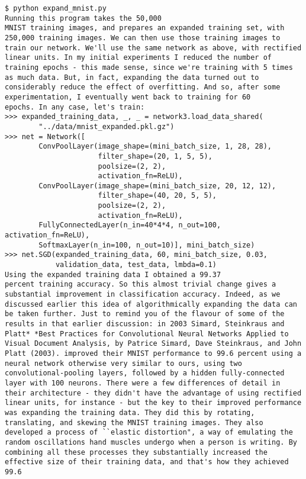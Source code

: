 \begin{lstlisting}
$ python expand_mnist.py
Running this program takes the 50,000
MNIST training images, and prepares an expanded training set, with 250,000 training images. We can then use those training images to train our network. We'll use the same network as above, with rectified linear units. In my initial experiments I reduced the number of training epochs - this made sense, since we're training with 5 times as much data. But, in fact, expanding the data turned out to considerably reduce the effect of overfitting. And so, after some experimentation, I eventually went back to training for 60
epochs. In any case, let's train:
>>> expanded_training_data, _, _ = network3.load_data_shared(
        "../data/mnist_expanded.pkl.gz")
>>> net = Network([
        ConvPoolLayer(image_shape=(mini_batch_size, 1, 28, 28), 
                      filter_shape=(20, 1, 5, 5), 
                      poolsize=(2, 2), 
                      activation_fn=ReLU),
        ConvPoolLayer(image_shape=(mini_batch_size, 20, 12, 12), 
                      filter_shape=(40, 20, 5, 5), 
                      poolsize=(2, 2), 
                      activation_fn=ReLU),
        FullyConnectedLayer(n_in=40*4*4, n_out=100, activation_fn=ReLU),
        SoftmaxLayer(n_in=100, n_out=10)], mini_batch_size)
>>> net.SGD(expanded_training_data, 60, mini_batch_size, 0.03, 
            validation_data, test_data, lmbda=0.1)
Using the expanded training data I obtained a 99.37
percent training accuracy. So this almost trivial change gives a substantial improvement in classification accuracy. Indeed, as we discussed earlier this idea of algorithmically expanding the data can be taken further. Just to remind you of the flavour of some of the results in that earlier discussion: in 2003 Simard, Steinkraus and Platt* *Best Practices for Convolutional Neural Networks Applied to Visual Document Analysis, by Patrice Simard, Dave Steinkraus, and John Platt (2003). improved their MNIST performance to 99.6 percent using a neural network otherwise very similar to ours, using two convolutional-pooling layers, followed by a hidden fully-connected layer with 100 neurons. There were a few differences of detail in their architecture - they didn't have the advantage of using rectified linear units, for instance - but the key to their improved performance was expanding the training data. They did this by rotating, translating, and skewing the MNIST training images. They also developed a process of ``elastic distortion", a way of emulating the random oscillations hand muscles undergo when a person is writing. By combining all these processes they substantially increased the effective size of their training data, and that's how they achieved 99.6

\end{lstlisting}
